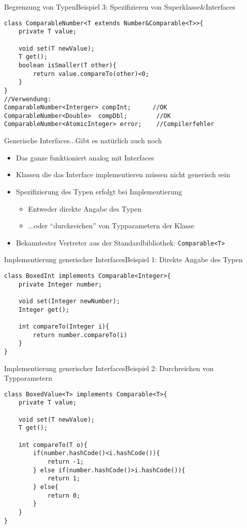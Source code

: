 \begin{frame}[fragile]{Begrenzung von Typen}{Beispiel 3: Spezifizieren von Superklasse\&Interfaces}
\lstset{style=javacode}
\begin{lstlisting}
class ComparableNumber<T extends Number&Comparable<T>>{
    private T value;
    
    void set(T newValue);
    T get();
    boolean isSmaller(T other){
        return value.compareTo(other)<0;
    }
}
//Verwendung:
ComparableNumber<Interger> compInt;      //OK
ComparableNumber<Double>  compDbl;        //OK
ComparableNumber<AtomicInteger> error;    //Compilerfehler
\end{lstlisting}
\end{frame}


\begin{frame}{Generische Interfaces}{...Gibt es natürlich auch noch}
    \begin{itemize}
        \item Das ganze funktioniert analog mit Interfaces
        \item Klassen die das Interface implementieren müssen nicht generisch sein
        \item Spezifizierung des Typen erfolgt bei Implementierung
        \begin{itemize}
            \item Entweder direkte Angabe des Typen
            \item ...oder "`durchreichen"' von Typparametern der Klasse
        \end{itemize}
        \item Bekanntester Vertreter aus der Standardbibliothek: \texttt{Comparable<T>}
    \end{itemize}
\end{frame}

\begin{frame}[fragile]{Implementierung generischer Interfaces}{Beispiel 1: Direkte Angabe des Typen}
\lstset{style=javacode}
\begin{lstlisting}
class BoxedInt implements Comparable<Integer>{
    private Integer number;
    
    void set(Integer newNumber);
    Integer get();
    
    int compareTo(Integer i){
        return number.compareTo(i)
    }
}
\end{lstlisting}
\end{frame}

\begin{frame}[fragile]{Implementierung generischer Interfaces}{Beispiel 2: Durchreichen von Typparametern}
\lstset{style=javacode}
\begin{lstlisting}
class BoxedValue<T> implements Comparable<T>{
    private T value;
    
    void set(T newValue);
    T get();
    
    int compareTo(T o){
        if(number.hashCode()<i.hashCode()){
            return -1;
        } else if(number.hashCode()>i.hashCode()){
            return 1;
        } else{
            return 0;
        }
    }
}
\end{lstlisting}
\end{frame}
